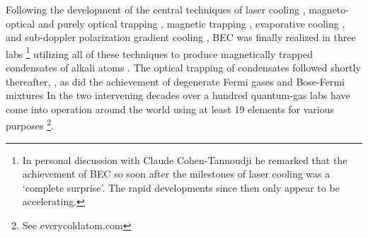 	Following the development of the central techniques of laser cooling \cite{Phillips82,Chu85}, magneto-optical and purely optical trapping \cite{Raab87,Chu86}, magnetic trapping \cite{Papers},	evaporative cooling \cite{Papers},	and sub-doppler polarization gradient cooling \cite{Lett88}, BEC was finally realized in three labs \footnote{In personal discussion with Claude Cohen-Tannoudji he remarked that the achievement of BEC so soon after the milestones of laser cooling was a `complete surprise'. The rapid developments since then only appear to be accelerating.} utilizing all of these techniques to produce magnetically trapped condensates of alkali atoms \cite{Anderson95,Davis95,Bradley95,Cornell02,Chu98}.	The optical trapping of condensates followed shortly thereafter, \cite{StamperKurn98}, as did the achievement of degenerate Fermi gases \cite{DeMarco99,Truscott01}
	and Bose-Fermi mixtures \cite{Schreck01}
	In the two intervening decades over a hundred quantum-gas labs have come into operation around the world using at least 19 elements for various purposes \footnote{See everycoldatom.com}.
